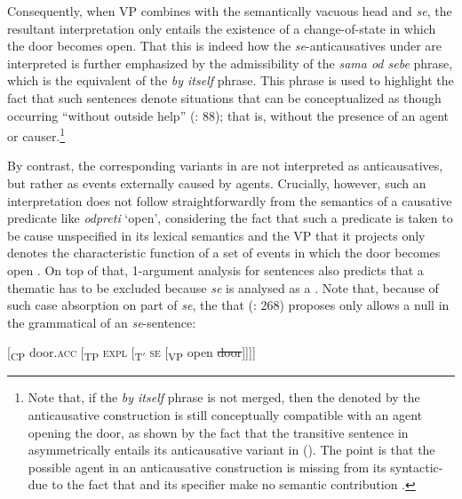 \documentclass[output=paper,nonflat,newtxmath]{langsci/langscibook}
\begin{document}
\noindent Consequently, when VP combines with the semantically vacuous  head and \textit{se}, the resultant interpretation only entails the existence of a change-of-state  in which the door becomes open. That this is indeed how the  \textit{se}-anticausatives under  are interpreted is further emphasized by the admissibility of the \textit{sama od sebe} phrase, which is the  equivalent of the  \textit{by itself} phrase. This phrase is used to highlight the fact that such sentences denote situations that can be conceptualized as though occurring “without outside help'' (\citealt{hovav1995}: 88); that is, without the presence of an agent or causer.\footnote{Note that, if the \textit{by itself} phrase is not merged, then the  denoted by the anticausative construction is still conceptually compatible with an agent opening the door, as shown by the fact that the transitive sentence in  asymmetrically entails its anticausative variant in  (\citealt{schafervivanco2016}). The point is that the possible agent in an anticausative construction is missing from its syntactic- due to the fact that  and its specifier make no semantic contribution .}

By contrast, the corresponding  variants in  are not interpreted as anticausatives, but rather as events externally caused by agents. Crucially, however, such an interpretation does not follow straightforwardly from the semantics of a causative predicate like \textit{odpreti} `open', considering the fact that such a predicate is taken to be cause unspecified in its lexical semantics and the VP that it projects only denotes the characteristic function of a set of events in which the door becomes open . On top of that,  1-argument analysis for  sentences also predicts that a thematic  has to be excluded because \textit{se} is analysed as a . Note that, because of such case absorption on part of \textit{se}, the  that \citeauthor{marelj2004} (\citeyear{marelj2004}: 268) proposes only allows a null  in the grammatical  of an  \textit{se}-sentence:
\begin{exe}
\ex \label{ex:lenardic: 9} {[\textsubscript{CP} door.\textsc{acc} [\textsubscript{TP} \textsc{expl} [\textsubscript{T$'$} \textsc{se} [\textsubscript{VP} open \st{door}]]]]}
\end{exe}
\end{document}
